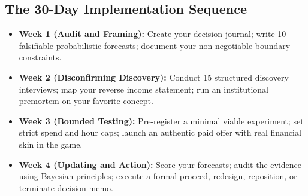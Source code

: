\subsection{The 30-Day Implementation Sequence}

\begin{itemize}[leftmargin=10pt,itemsep=2pt,topsep=1pt]
  \item \textbf{Week 1 (Audit and Framing):} Create your decision journal; write 10 falsifiable probabilistic forecasts; document your non-negotiable boundary constraints.
  \item \textbf{Week 2 (Disconfirming Discovery):} Conduct 15 structured discovery interviews; map your reverse income statement; run an institutional premortem on your favorite concept.
  \item \textbf{Week 3 (Bounded Testing):} Pre-register a minimal viable experiment; set strict spend and hour caps; launch an authentic paid offer with real financial skin in the game.
  \item \textbf{Week 4 (Updating and Action):} Score your forecasts; audit the evidence using Bayesian principles; execute a formal proceed, redesign, reposition, or terminate decision memo.
\end{itemize}

